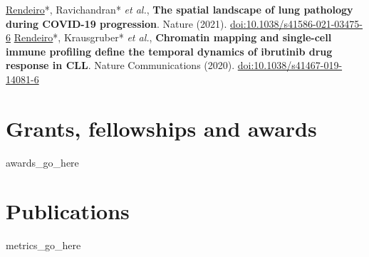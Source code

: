 \documentclass[11pt,a4paper,roman]{moderncv} %
\begin{document}
        {\underline{Rendeiro}*, Ravichandran* \textit{et al.}, \textbf{The spatial landscape of lung pathology during COVID-19 progression}. Nature (2021). \href{https://doi.org/10.1038/s41586-021-03475-6}{doi:10.1038/s41586-021-03475-6}}
        {\underline{Rendeiro}*, Krausgruber* \textit{et al.}, \textbf{Chromatin mapping and single-cell immune profiling define the temporal dynamics of ibrutinib drug response in CLL}. Nature Communications (2020). \href{https://doi.org/10.1038/s41467-019-14081-6}{doi:10.1038/s41467-019-14081-6}}

\section{Grants, fellowships and awards}
    {{awards_go_here}}


\section{Publications}

    {{metrics_go_here}}
\end{document}
